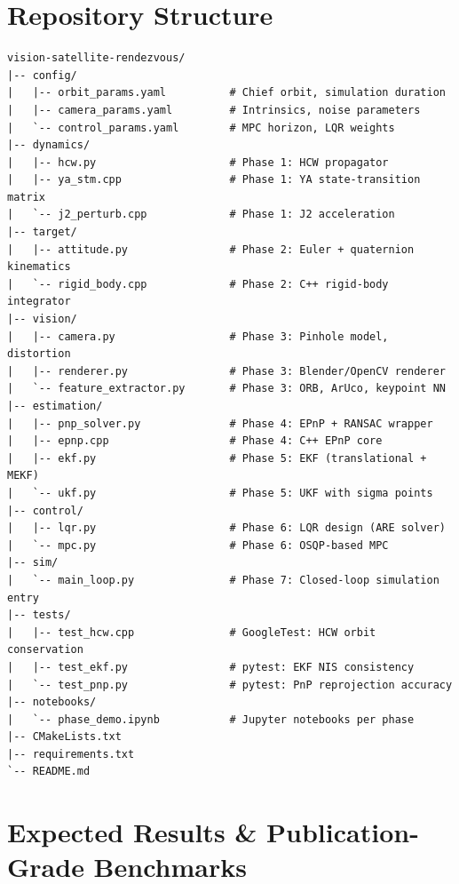 \documentclass[12pt, a4paper]{article}
\begin{document}
\section{Repository Structure}

\begin{verbatim}
vision-satellite-rendezvous/
|-- config/
|   |-- orbit_params.yaml          # Chief orbit, simulation duration
|   |-- camera_params.yaml         # Intrinsics, noise parameters
|   `-- control_params.yaml        # MPC horizon, LQR weights
|-- dynamics/
|   |-- hcw.py                     # Phase 1: HCW propagator
|   |-- ya_stm.cpp                 # Phase 1: YA state-transition matrix
|   `-- j2_perturb.cpp             # Phase 1: J2 acceleration
|-- target/
|   |-- attitude.py                # Phase 2: Euler + quaternion kinematics
|   `-- rigid_body.cpp             # Phase 2: C++ rigid-body integrator
|-- vision/
|   |-- camera.py                  # Phase 3: Pinhole model, distortion
|   |-- renderer.py                # Phase 3: Blender/OpenCV renderer
|   `-- feature_extractor.py       # Phase 3: ORB, ArUco, keypoint NN
|-- estimation/
|   |-- pnp_solver.py              # Phase 4: EPnP + RANSAC wrapper
|   |-- epnp.cpp                   # Phase 4: C++ EPnP core
|   |-- ekf.py                     # Phase 5: EKF (translational + MEKF)
|   `-- ukf.py                     # Phase 5: UKF with sigma points
|-- control/
|   |-- lqr.py                     # Phase 6: LQR design (ARE solver)
|   `-- mpc.py                     # Phase 6: OSQP-based MPC
|-- sim/
|   `-- main_loop.py               # Phase 7: Closed-loop simulation entry
|-- tests/
|   |-- test_hcw.cpp               # GoogleTest: HCW orbit conservation
|   |-- test_ekf.py                # pytest: EKF NIS consistency
|   `-- test_pnp.py                # pytest: PnP reprojection accuracy
|-- notebooks/
|   `-- phase_demo.ipynb           # Jupyter notebooks per phase
|-- CMakeLists.txt
|-- requirements.txt
`-- README.md
\end{verbatim}

\section{Expected Results \& Publication-Grade Benchmarks}
\end{document}
